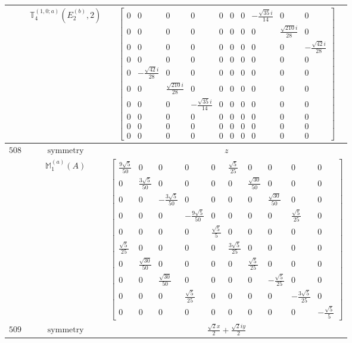 \documentclass[fleqn,8pt,landscape]{jsarticle}
\begin{document}
\begin{longtable}{ccc}
$  $ & $ \mathbb{T}_{4}^{(1,0;a)}(E_{2}^{(b)},2) $ & $ \begin{bmatrix} 0 & 0 & 0 & 0 & 0 & 0 & 0 & - \frac{\sqrt{35} i}{14} & 0 & 0 \\ 0 & 0 & 0 & 0 & 0 & 0 & 0 & 0 & \frac{\sqrt{210} i}{28} & 0 \\ 0 & 0 & 0 & 0 & 0 & 0 & 0 & 0 & 0 & - \frac{\sqrt{42} i}{28} \\ 0 & 0 & 0 & 0 & 0 & 0 & 0 & 0 & 0 & 0 \\ 0 & - \frac{\sqrt{42} i}{28} & 0 & 0 & 0 & 0 & 0 & 0 & 0 & 0 \\ 0 & 0 & \frac{\sqrt{210} i}{28} & 0 & 0 & 0 & 0 & 0 & 0 & 0 \\ 0 & 0 & 0 & - \frac{\sqrt{35} i}{14} & 0 & 0 & 0 & 0 & 0 & 0 \\ 0 & 0 & 0 & 0 & 0 & 0 & 0 & 0 & 0 & 0 \\ 0 & 0 & 0 & 0 & 0 & 0 & 0 & 0 & 0 & 0 \\ 0 & 0 & 0 & 0 & 0 & 0 & 0 & 0 & 0 & 0 \end{bmatrix} $ \\ \hline
$ 508 $ & $ \text{symmetry} $ & $ z $ \\
$  $ & $ \mathbb{M}_{1}^{(a)}(A) $ & $ \begin{bmatrix} \frac{9 \sqrt{5}}{50} & 0 & 0 & 0 & 0 & \frac{\sqrt{5}}{25} & 0 & 0 & 0 & 0 \\ 0 & \frac{3 \sqrt{5}}{50} & 0 & 0 & 0 & 0 & \frac{\sqrt{30}}{50} & 0 & 0 & 0 \\ 0 & 0 & - \frac{3 \sqrt{5}}{50} & 0 & 0 & 0 & 0 & \frac{\sqrt{30}}{50} & 0 & 0 \\ 0 & 0 & 0 & - \frac{9 \sqrt{5}}{50} & 0 & 0 & 0 & 0 & \frac{\sqrt{5}}{25} & 0 \\ 0 & 0 & 0 & 0 & \frac{\sqrt{5}}{5} & 0 & 0 & 0 & 0 & 0 \\ \frac{\sqrt{5}}{25} & 0 & 0 & 0 & 0 & \frac{3 \sqrt{5}}{25} & 0 & 0 & 0 & 0 \\ 0 & \frac{\sqrt{30}}{50} & 0 & 0 & 0 & 0 & \frac{\sqrt{5}}{25} & 0 & 0 & 0 \\ 0 & 0 & \frac{\sqrt{30}}{50} & 0 & 0 & 0 & 0 & - \frac{\sqrt{5}}{25} & 0 & 0 \\ 0 & 0 & 0 & \frac{\sqrt{5}}{25} & 0 & 0 & 0 & 0 & - \frac{3 \sqrt{5}}{25} & 0 \\ 0 & 0 & 0 & 0 & 0 & 0 & 0 & 0 & 0 & - \frac{\sqrt{5}}{5} \end{bmatrix} $ \\ \hline
$ 509 $ & $ \text{symmetry} $ & $ \frac{\sqrt{2} x}{2} + \frac{\sqrt{2} i y}{2} $ \\

\end{longtable}
\end{document}
